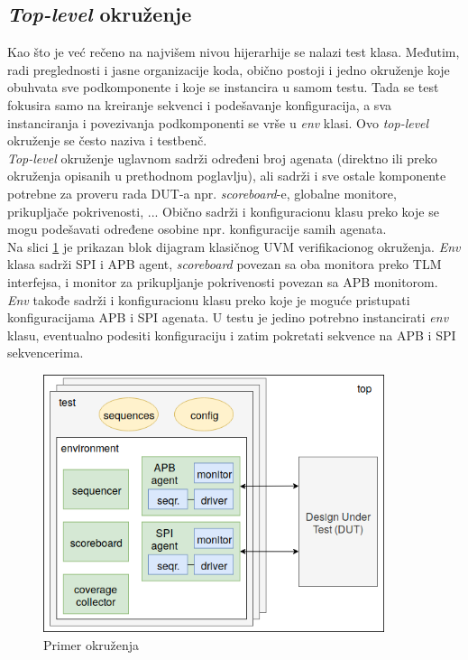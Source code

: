 
\subsection{\emph{Top-level} okruženje}

Kao što je već rečeno na najvišem nivou hijerarhije se nalazi test klasa.
Međutim, radi preglednosti i jasne organizacije koda, obično postoji i jedno
okruženje koje obuhvata sve podkomponente i koje se instancira u samom testu.
Tada se test fokusira samo na kreiranje sekvenci i podešavanje konfiguracija, a
sva instanciranja i povezivanja podkomponenti se vrše u \emph{env} klasi. Ovo
\emph{top-level} okruženje se često naziva i testbenč.\\

\emph{Top-level} okruženje uglavnom sadrži određeni broj agenata (direktno ili
preko okruženja opisanih u prethodnom poglavlju), ali sadrži i sve ostale
komponente potrebne za proveru rada DUT-a npr. \emph{scoreboard}-e, globalne
monitore, prikupljače pokrivenosti, ... Obično sadrži i konfiguracionu klasu
preko koje se mogu podešavati određene osobine npr. konfiguracije samih
agenata.\\

Na slici \ref{fig:top_env} je prikazan blok dijagram klasičnog UVM
verifikacionog okruženja. \emph{Env} klasa sadrži SPI i APB agent,
\emph{scoreboard} povezan sa oba monitora preko TLM interfejsa, i monitor za
prikupljanje pokrivenosti povezan sa APB monitorom. \emph{Env} takođe sadrži i
konfiguracionu klasu preko koje je moguće pristupati konfiguracijama APB i SPI
agenata. U testu je jedino potrebno instancirati \emph{env} klasu, eventualno
podesiti konfiguraciju i zatim pokretati sekvence na APB i SPI sekvencerima.

\begin{figure}[h!]
  \centering
  \includegraphics[width=100mm]{img/v9_top_env.png}
  \caption{Primer okruženja}
  \label{fig:top_env}
\end{figure}


